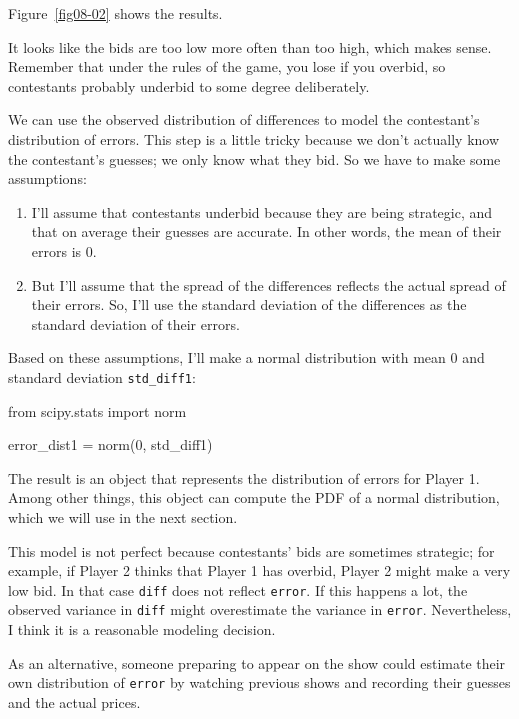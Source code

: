 \documentclass[12pt]{book}
\theoremstyle{exercise}
\newcommand{\py}[1]{{\tt #1}}%
\begin{document}
Figure~\ref{fig08-02} shows the results.

It looks like the bids are too low more often than too high, which makes sense.
Remember that under the rules of the game, you lose if you overbid, so contestants probably underbid to some degree deliberately.

We can use the observed distribution of differences to model the contestant's distribution of errors.
This step is a little tricky because we don't actually know the contestant's guesses; we only know what they bid.
So we have to make some assumptions:

\begin{enumerate}

\item I'll assume that contestants underbid because they are being strategic, and that on average their guesses are accurate.  In other words, the mean of their errors is 0.

\item But I'll assume that the spread of the differences reflects the actual spread of their errors.  So, I'll use the standard deviation of the differences as the standard deviation of their errors.

\end{enumerate}

Based on these assumptions, I'll make a normal distribution with mean 0 and standard deviation \py{std_diff1}:

\begin{code}
from scipy.stats import norm

error_dist1 = norm(0, std_diff1)
\end{code}

The result is an object that represents the distribution of errors for Player 1.
Among other things, this object can compute the PDF of a normal distribution, which we will use in the next section.


This model is not perfect because contestants' bids are sometimes strategic; for example, if Player 2 thinks that Player 1
has overbid, Player 2 might make a very low bid.
In that case \py{diff} does not reflect \py{error}.
If this happens a lot, the observed variance in \py{diff} might overestimate the variance in \py{error}.
Nevertheless, I think it is a reasonable modeling decision.

As an alternative, someone preparing to appear on the show could
estimate their own distribution of \py{error} by watching previous shows
and recording their guesses and the actual prices.
\end{document}
